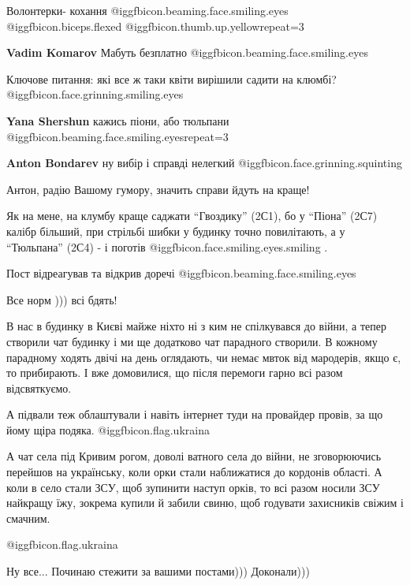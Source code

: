 \begin{itemize}
Волонтерки- кохання @igg{fbicon.beaming.face.smiling.eyes}  @igg{fbicon.biceps.flexed}  @igg{fbicon.thumb.up.yellow}{repeat=3} 

\textbf{Vadim Komarov} Мабуть безплатно @igg{fbicon.beaming.face.smiling.eyes} 

Ключове питання: які все ж таки квіти вирішили садити на клюмбі?  @igg{fbicon.face.grinning.smiling.eyes} 

\begin{itemize} %
\textbf{Yana Shershun} кажись піони, або тюльпани @igg{fbicon.beaming.face.smiling.eyes}{repeat=3} 

\textbf{Anton Bondarev} ну вибір і справді нелегкий  @igg{fbicon.face.grinning.squinting} 
\end{itemize} %


Антон, радію Вашому гумору, значить справи йдуть на краще!

Як на мене, на клумбу краще саджати \enquote{Гвоздику} (2С1), бо у
\enquote{Піона} (2С7) калібр більший, при стрільбі шибки у будинку точно
повилітають, а у \enquote{Тюльпана} (2С4) - і поготів  @igg{fbicon.face.smiling.eyes.smiling} .

Пост відреагував та відкрив доречі @igg{fbicon.beaming.face.smiling.eyes} 

Все норм ))) всі бдять!


В нас в будинку в Києві майже ніхто ні з ким не спілкувався до війни, а тепер
створили чат будинку і ми ще додатково чат парадного створили. В кожному
парадному ходять двічі на день оглядають, чи немає мвток від мародерів, якщо є,
то прибирають. І вже домовилися, що після перемоги гарно всі разом
відсвяткуємо.

А підвали теж облаштували і навіть інтернет туди на провайдер провів, за що
йому щіра подяка. @igg{fbicon.flag.ukraina}


А чат села під Кривим рогом, доволі ватного села до війни, не зговорюючись
перейшов на українську, коли орки стали наближатися до кордонів області. А коли
в село стали ЗСУ, щоб зупинити наступ орків, то всі разом носили ЗСУ найкращу
їжу, зокрема купили й забили свиню, щоб годувати захисників свіжим і смачним.

@igg{fbicon.flag.ukraina}

Ну все... Починаю стежити за вашими постами))) Доконали)))

\end{itemize} %
